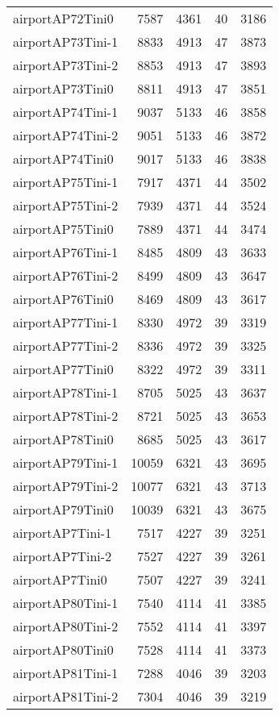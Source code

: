 \begin{longtable}{lrrrr}
airportAP72Tini0 & 7587 & 4361 & 40 & 3186 \\
airportAP73Tini-1 & 8833 & 4913 & 47 & 3873 \\
airportAP73Tini-2 & 8853 & 4913 & 47 & 3893 \\
airportAP73Tini0 & 8811 & 4913 & 47 & 3851 \\
airportAP74Tini-1 & 9037 & 5133 & 46 & 3858 \\
airportAP74Tini-2 & 9051 & 5133 & 46 & 3872 \\
airportAP74Tini0 & 9017 & 5133 & 46 & 3838 \\
airportAP75Tini-1 & 7917 & 4371 & 44 & 3502 \\
airportAP75Tini-2 & 7939 & 4371 & 44 & 3524 \\
airportAP75Tini0 & 7889 & 4371 & 44 & 3474 \\
airportAP76Tini-1 & 8485 & 4809 & 43 & 3633 \\
airportAP76Tini-2 & 8499 & 4809 & 43 & 3647 \\
airportAP76Tini0 & 8469 & 4809 & 43 & 3617 \\
airportAP77Tini-1 & 8330 & 4972 & 39 & 3319 \\
airportAP77Tini-2 & 8336 & 4972 & 39 & 3325 \\
airportAP77Tini0 & 8322 & 4972 & 39 & 3311 \\
airportAP78Tini-1 & 8705 & 5025 & 43 & 3637 \\
airportAP78Tini-2 & 8721 & 5025 & 43 & 3653 \\
airportAP78Tini0 & 8685 & 5025 & 43 & 3617 \\
airportAP79Tini-1 & 10059 & 6321 & 43 & 3695 \\
airportAP79Tini-2 & 10077 & 6321 & 43 & 3713 \\
airportAP79Tini0 & 10039 & 6321 & 43 & 3675 \\
airportAP7Tini-1 & 7517 & 4227 & 39 & 3251 \\
airportAP7Tini-2 & 7527 & 4227 & 39 & 3261 \\
airportAP7Tini0 & 7507 & 4227 & 39 & 3241 \\
airportAP80Tini-1 & 7540 & 4114 & 41 & 3385 \\
airportAP80Tini-2 & 7552 & 4114 & 41 & 3397 \\
airportAP80Tini0 & 7528 & 4114 & 41 & 3373 \\
airportAP81Tini-1 & 7288 & 4046 & 39 & 3203 \\
airportAP81Tini-2 & 7304 & 4046 & 39 & 3219 \\

\end{longtable}
